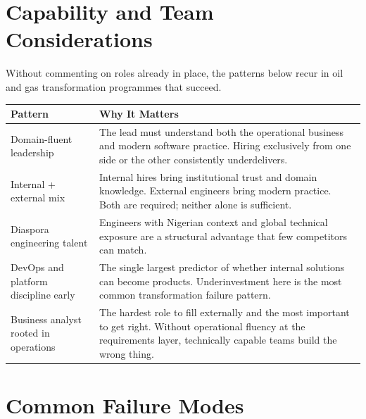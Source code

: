 \documentclass[10pt]{article}
\newcommand{\spacer}{\vspace{10pt}}
\newcommand{\bigspacer}{\vspace{16pt}}
\begin{document}
\bigspacer

\section{Capability and Team Considerations}

Without commenting on roles already in place, the patterns below recur in
oil and gas transformation programmes that succeed.

\spacer
\small
\begin{tabularx}{\columnwidth}{@{}lX@{}}
\toprule
\textbf{Pattern} & \textbf{Why It Matters} \\
\midrule
Domain-fluent leadership
  & The lead must understand both the operational business and modern
    software practice. Hiring exclusively from one side or the other
    consistently underdelivers. \\
Internal + external mix
  & Internal hires bring institutional trust and domain knowledge.
    External engineers bring modern practice. Both are required;
    neither alone is sufficient. \\
Diaspora engineering talent
  & Engineers with Nigerian context and global technical exposure are
    a structural advantage that few competitors can match. \\
DevOps and platform discipline early
  & The single largest predictor of whether internal solutions can become
    products. Underinvestment here is the most common transformation
    failure pattern. \\
Business analyst rooted in operations
  & The hardest role to fill externally and the most important to get
    right. Without operational fluency at the requirements layer,
    technically capable teams build the wrong thing. \\
\bottomrule
\end{tabularx}
\normalsize

\bigspacer

\section{Common Failure Modes}
\end{document}
